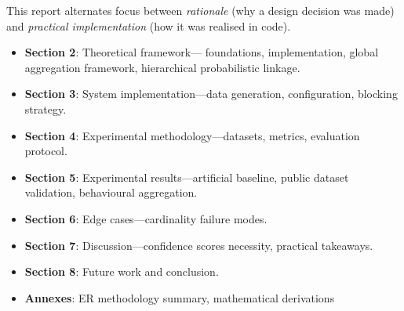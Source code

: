 This report alternates focus between \textit{rationale} (why a design decision was made) and \textit{practical implementation} (how it was realised in code).
\begin{itemize}
	\item \textbf{Section 2}: Theoretical framework—\fellegisunter{} foundations, \splink{} implementation, global aggregation framework, hierarchical probabilistic linkage.
	\item \textbf{Section 3}: System implementation—data generation, \splink{} configuration, blocking strategy.
	\item \textbf{Section 4}: Experimental methodology—datasets, metrics, evaluation protocol.
	\item \textbf{Section 5}: Experimental results—artificial baseline, public dataset validation, behavioural aggregation.
	\item \textbf{Section 6}: Edge cases—cardinality failure modes.
	\item \textbf{Section 7}: Discussion—confidence scores necessity, practical takeaways.
	\item \textbf{Section 8}: Future work and conclusion.
	\item \textbf{Annexes}: ER methodology summary, mathematical derivations
\end{itemize}
